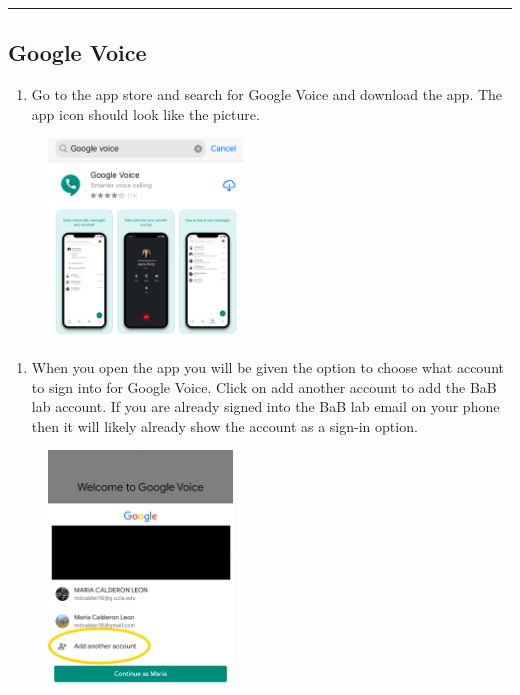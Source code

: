 \documentclass[]{book}
\providecommand{\tightlist}{%
  \setlength{\itemsep}{0pt}\setlength{\parskip}{0pt}}
\begin{document}
\begin{center}\rule{0.5\linewidth}{0.5pt}\end{center}

\subsection{Google Voice}\label{google-voice}

\begin{enumerate}
\def\labelenumi{\arabic{enumi})}
\tightlist
\item
  Go to the app store and search for Google Voice and download the app.
  The app icon should look like the picture.
\end{enumerate}

\begin{figure}
\centering
\includegraphics{images/research_protocols/google_voice/pic1.png}
\caption{}
\end{figure}

\begin{enumerate}
\def\labelenumi{\arabic{enumi})}
\setcounter{enumi}{1}
\tightlist
\item
  When you open the app you will be given the option to choose what
  account to sign into for Google Voice. Click on add another account to
  add the BaB lab account. If you are already signed into the BaB lab
  email on your phone then it will likely already show the account as a
  sign-in option.
\end{enumerate}

\begin{figure}
\centering
\includegraphics{images/research_protocols/google_voice/pic2.png}
\caption{}
\end{figure}
\end{document}
